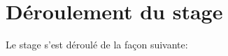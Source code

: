 \documentclass[a4paper, 11pt, french]{report}
\begin{document}
                                                                                                                                                                                                  \section*{Déroulement
                                                                                                                                                                                                  du
                                                                                                                                                                                                  stage}
                                                                                                                                                                                                     Le
                                                                                                                                                                                                     stage
                                                                                                                                                                                                     s'est
                                                                                                                                                                                                     déroulé
                                                                                                                                                                                                     de
                                                                                                                                                                                                     la
                                                                                                                                                                                                     façon
                                                                                                                                                                                                     suivante:
\end{document}
